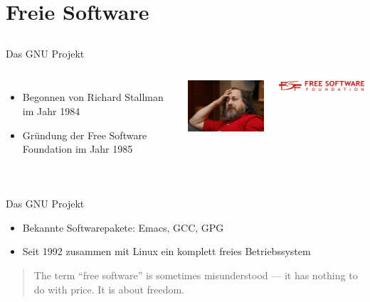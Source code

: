 \documentclass[12pt]{beamer}
\begin{document}
\section{Freie Software}


\subsection{}
\begin{frame}{Das GNU Projekt}

\begin{columns}


\column{6cm}
\begin{itemize}
\item Begonnen von Richard Stallman im Jahr 1984 
\item Gründung der Free Software Foundation im Jahr 1985 
\end{itemize}

\column{7cm}


\begin{center}
\includegraphics[width=4.5cm]{img/stallman}
\par\end{center}


\begin{center}
\includegraphics[width=5cm]{img/logo-fsf}
\par\end{center}

\end{columns}
\end{frame}



\subsection{}
\begin{frame}{Das GNU Projekt}

\begin{itemize}
\item Bekannte Softwarepakete: Emacs, GCC, GPG 
\item Seit 1992 zusammen mit Linux ein komplett freies Betriebssystem \end{itemize}
\begin{quote}
\textquotedbl{}The term “free software” is sometimes misunderstood — it
has nothing to do with price. It is about freedom.\textquotedbl{} 
\end{quote}
\end{frame}
\end{document}
